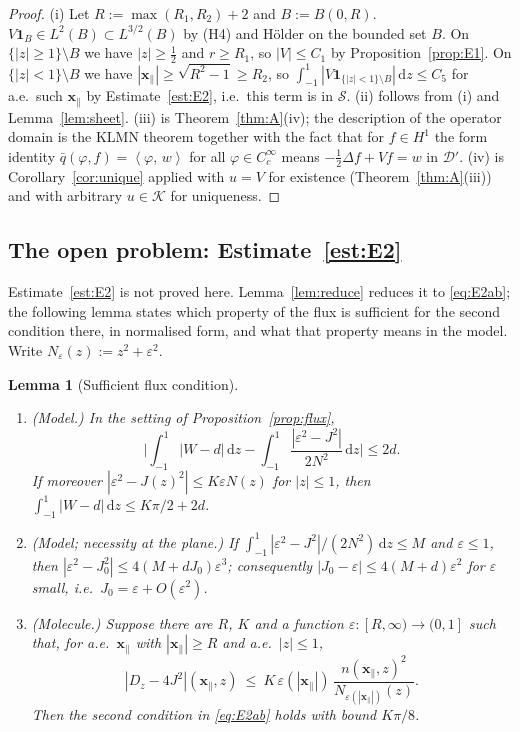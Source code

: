 \documentclass[11pt,a4paper]{article}
\theoremstyle{plain}
\newtheorem{lemma}[theorem]{Lemma}
\theoremstyle{definition}
\theoremstyle{remark}
\newcommand{\KK}{\mathcal{K}}
\renewcommand{\SS}{\mathcal{S}}
\newcommand{\dd}{\,\mathrm{d}}
\newcommand{\ip}[2]{\left\langle #1,\,#2\right\rangle}
\begin{document}
\begin{proof}
(i) Let $R:=\max(R_1,R_2)+2$ and $B:=B(0,R)$. $V\mathbf 1_B\in L^2(B)\subset L^{3/2}(B)$ by (H4) and H\"older on the bounded set $B$. On $\{|z|\ge1\}\setminus B$ we have $|z|\ge\tfrac12$ and $r\ge R_1$, so $|V|\le C_1$ by Proposition~\ref{prop:E1}. On $\{|z|<1\}\setminus B$ we have $|\mathbf x_\parallel|\ge\sqrt{R^2-1}\ge R_2$, so $\int_{-1}^1|V\mathbf 1_{\{|z|<1\}\setminus B}|\dd z\le C_5$ for a.e.\ such $\mathbf x_\parallel$ by Estimate~\ref{est:E2}, i.e.\ this term is in $\SS$. (ii) follows from (i) and Lemma~\ref{lem:sheet}. (iii) is Theorem~\ref{thm:A}(iv); the description of the operator domain is the KLMN theorem \cite[Thm.~X.17]{RS2} together with the fact that for $f\in H^1$ the form identity $\bar q(\varphi,f)=\ip\varphi{w}$ for all $\varphi\in C_c^\infty$ means $-\tfrac12\Delta f+Vf=w$ in $\mathcal D'$. (iv) is Corollary~\ref{cor:unique} applied with $u=V$ for existence (Theorem~\ref{thm:A}(iii)) and with arbitrary $u\in\KK$ for uniqueness.
\end{proof}

\subsection{The open problem: Estimate~\ref{est:E2}}
Estimate~\ref{est:E2} is not proved here. Lemma~\ref{lem:reduce} reduces it to \eqref{eq:E2ab}; the following lemma states which property of the flux is sufficient for the second condition there, in normalised form, and what that property means in the model. Write $N_\varepsilon(z):=z^2+\varepsilon^2$.

\begin{lemma}[Sufficient flux condition]\label{lem:flux}
\begin{enumerate}
\item[(a)] (Model.) In the setting of Proposition~\ref{prop:flux},
\[
\Big|\int_{-1}^{1}|W-d|\dd z-\int_{-1}^{1}\frac{|\varepsilon^2-J^2|}{2N^2}\dd z\Big|\le2d .
\]
If moreover $|\varepsilon^2-J(z)^2|\le K\varepsilon N(z)$ for $|z|\le1$, then $\int_{-1}^{1}|W-d|\dd z\le K\pi/2+2d$.
\item[(b)] (Model; necessity at the plane.) If $\int_{-1}^{1}|\varepsilon^2-J^2|/(2N^2)\dd z\le M$ and $\varepsilon\le1$, then $|\varepsilon^2-J_0^2|\le4(M+dJ_0)\varepsilon^3$; consequently $|J_0-\varepsilon|\le4(M+d)\varepsilon^2$ for $\varepsilon$ small, i.e.\ $J_0=\varepsilon+O(\varepsilon^2)$.
\item[(c)] (Molecule.) Suppose there are $R$, $K$ and a function $\varepsilon\colon[R,\infty)\to(0,1]$ such that, for a.e.\ $\mathbf x_\parallel$ with $|\mathbf x_\parallel|\ge R$ and a.e.\ $|z|\le1$,
\begin{equation}\label{eq:F3}
|D_z-4J^2|(\mathbf x_\parallel,z)\ \le\ K\,\varepsilon(|\mathbf x_\parallel|)\,\frac{n(\mathbf x_\parallel,z)^2}{N_{\varepsilon(|\mathbf x_\parallel|)}(z)} .
\end{equation}
Then the second condition in \eqref{eq:E2ab} holds with bound $K\pi/8$.
\end{enumerate}
\end{lemma}
\end{document}
